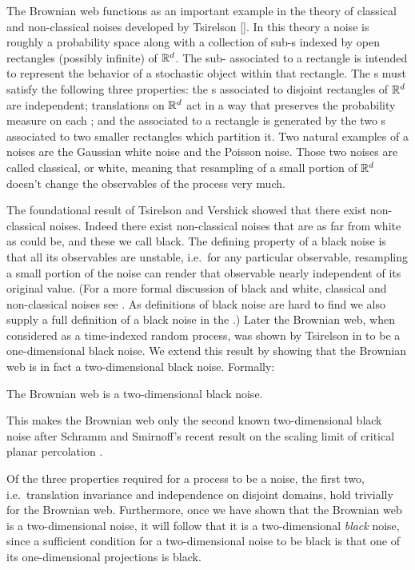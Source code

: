 {The Brownian web functions as an important example in the theory of
classical and non-classical noises developed by Tsirelson []. In this
theory a noise is roughly a probability space along with a collection
of sub-\sigfield{}s indexed by open rectangles (possibly infinite) of
$\mathbb{R}^d$.  The sub-\sigfield{} associated to a rectangle is intended to
represent the behavior of a stochastic object within that rectangle.
The \sigfield{}s must satisfy the following three properties:
the \sigfield{}s associated to disjoint rectangles of $\mathbb{R}^d$ are
independent; translations on $\mathbb{R}^d$ act in a way that preserves the
probability measure on each \sigfield{}; and the \sigfield{}
associated to a rectangle is generated by the two \sigfield{}s
associated to two smaller rectangles which partition it.
Two natural examples of a noises are the Gaussian white noise
and the Poisson noise. Those two noises are called classical, or white,
meaning that
resampling of a small portion of $\mathbb{R}^d$ doesn't change the observables of the
process very much.

The foundational result of Tsirelson and Vershick showed that there
exist non-classical noises.  Indeed there exist non-classical noises
that are as far from white as could be, and these we call black.  The
defining property of a black noise is that all its observables are
unstable, i.e.\ for any particular observable, resampling a small portion of the noise can
render that observable nearly independent of its original
value.  (For a more formal discussion of black and white, classical
and non-classical noises see \TODO{}{}.  As definitions of black noise are
hard to find we also supply a full definition of a black noise in
the .)  Later the Brownian web,
when considered as a time-indexed random process,
was shown by Tsirelson in \TODO{}{} to be a one-dimensional black noise.  We
extend this
result by showing that the Brownian web is in fact a two-dimensional
black noise.  Formally:

\begin{theorem}
\label{thm:bw-2d-black-noise}
The Brownian web is a
two-dimensional black noise.
\end{theorem}

This makes the Brownian web only the second
known two-dimensional black noise after Schramm and Smirnoff's
recent result on the scaling limit of critical planar
percolation .

Of the three properties required for a process to be a noise, the
first two, i.e.\ translation invariance and independence on disjoint
domains, hold trivially for the Brownian web.  Furthermore, once we
have shown that the Brownian web is a two-dimensional noise, it will
follow that it is a two-dimensional \emph{black} noise, since a
sufficient condition for a two-dimensional noise to be black is that
one of its one-dimensional projections is black.

}

